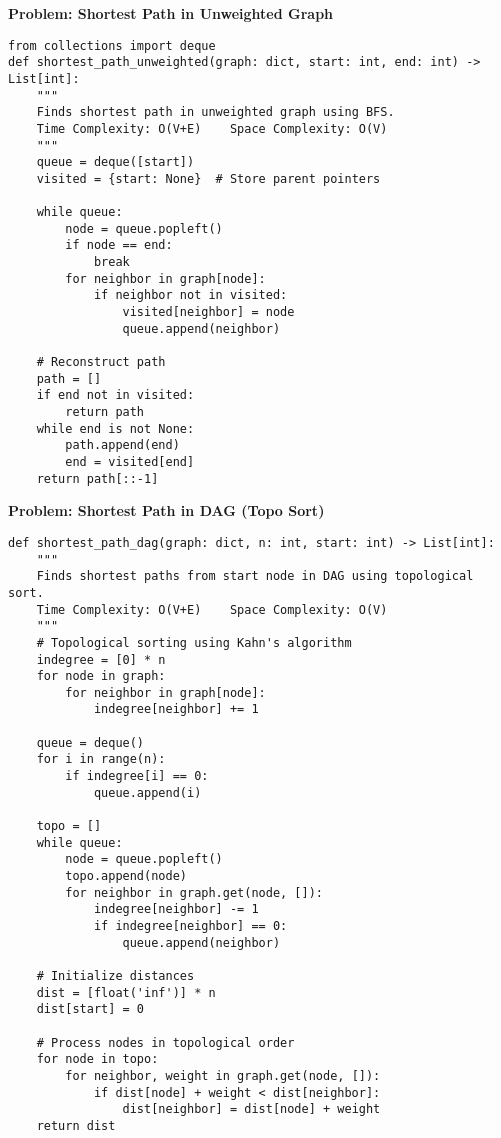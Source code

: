 \noindent\textbf{Problem: Shortest Path in Unweighted Graph}
\begin{verbatim}
from collections import deque
def shortest_path_unweighted(graph: dict, start: int, end: int) -> List[int]:
    """
    Finds shortest path in unweighted graph using BFS.
    Time Complexity: O(V+E)    Space Complexity: O(V)
    """
    queue = deque([start])
    visited = {start: None}  # Store parent pointers
    
    while queue:
        node = queue.popleft()
        if node == end:
            break
        for neighbor in graph[node]:
            if neighbor not in visited:
                visited[neighbor] = node
                queue.append(neighbor)
    
    # Reconstruct path
    path = []
    if end not in visited:
        return path
    while end is not None:
        path.append(end)
        end = visited[end]
    return path[::-1]
\end{verbatim}

\noindent\textbf{Problem: Shortest Path in DAG (Topo Sort)}
\begin{verbatim}
def shortest_path_dag(graph: dict, n: int, start: int) -> List[int]:
    """
    Finds shortest paths from start node in DAG using topological sort.
    Time Complexity: O(V+E)    Space Complexity: O(V)
    """
    # Topological sorting using Kahn's algorithm
    indegree = [0] * n
    for node in graph:
        for neighbor in graph[node]:
            indegree[neighbor] += 1
    
    queue = deque()
    for i in range(n):
        if indegree[i] == 0:
            queue.append(i)
    
    topo = []
    while queue:
        node = queue.popleft()
        topo.append(node)
        for neighbor in graph.get(node, []):
            indegree[neighbor] -= 1
            if indegree[neighbor] == 0:
                queue.append(neighbor)
    
    # Initialize distances
    dist = [float('inf')] * n
    dist[start] = 0
    
    # Process nodes in topological order
    for node in topo:
        for neighbor, weight in graph.get(node, []):
            if dist[node] + weight < dist[neighbor]:
                dist[neighbor] = dist[node] + weight
    return dist
\end{verbatim}

